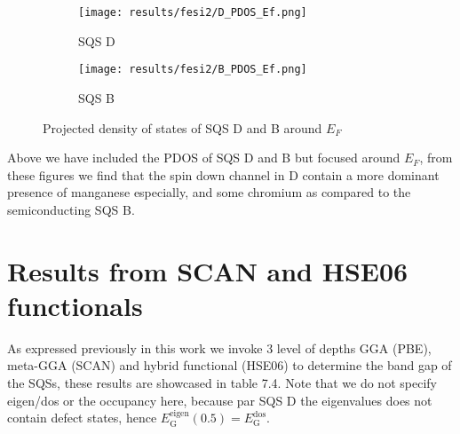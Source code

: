   
\begin{figure}[H]
	\centering
	\begin{subfigure}{.45\textwidth}
			\texttt{[image: results/fesi2/D\_PDOS\_Ef.png]}
			\caption{SQS D}		
	\end{subfigure}
	\hspace{0.5cm}
	\begin{subfigure}{.45\textwidth}
		\texttt{[image: results/fesi2/B\_PDOS\_Ef.png]}
		\caption{SQS B}		
	\end{subfigure}
	\caption{Projected density of states of SQS D and B around $E_F$}
\end{figure}

Above we have included the PDOS of SQS D and B but focused around $E_F$, from these figures we find that the spin down channel in D contain a more dominant presence of manganese especially, and some chromium as compared to the semiconducting SQS B.  

\section{Results from SCAN and HSE06 functionals}
As expressed previously in this work we invoke 3 level of depths GGA (PBE), meta-GGA (SCAN) and hybrid functional (HSE06) to determine the band gap of the SQSs, these results are showcased in table 7.4. Note that we do not specify eigen/dos or the occupancy here, because par SQS D the eigenvalues does not contain defect states, hence $E_\text{G} ^\text{eigen}(0.5) = E_\text{G} ^\text{dos}$.

